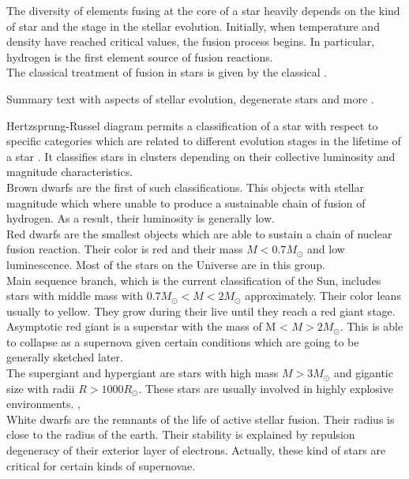 \documentclass[openany]{book}
\begin{document}
The diversity of elements fusing at the core of a star heavily depends on the kind of star and the stage in the stellar evolution.  Initially, when temperature and density have reached critical values, the fusion process begins. In particular, hydrogen is the first element source of fusion reactions. \\

The classical treatment of fusion in stars is given by the classical \cite{burbidge_burbidge_fowler_hoyle_1957}.

Summary text with aspects of stellar evolution, degenerate stars and more \cite{kundt_2005}.

Hertzsprung-Russel diagram permits a classification of a star with respect to specific categories which are related to different evolution stages in the lifetime of a star \cite{arsentieva_shevchenko_2021}. It classifies stars in clusters depending on their collective luminosity and magnitude characteristics. \\

Brown dwarfs are the first of such classifications. This objects with stellar magnitude which where unable to produce a sustainable chain of fusion of hydrogen. As a result, their luminosity is generally low. \\

Red dwarfs are the smallest objects which are able to sustain a chain of nuclear fusion reaction. Their color is red and their mass $M < 0.7M_{\odot}$ and low luminescence. Most of the stars on the Universe are in this group. \\

Main sequence branch, which is the current classification of the Sun, includes stars with middle mass with $ 0.7M_{\odot} < M < 2M_{\odot}$ approximately. Their color leans usually to yellow. They grow during their live until they reach a red giant stage. \\

Asymptotic red giant is a superstar with the mass of  M < $M > 2M_{\odot}$. This is able to collapse as a supernova given certain conditions which are going to be generally sketched later. \\

The supergiant and hypergiant are stars with  high mass $M > 3M_{\odot}$ and gigantic size with radii $R > 1000R_{\odot}$. These stars are usually involved in highly explosive environments. , \\

White dwarfs are the remnants of the life of active stellar fusion. Their radius is close to the radius of the earth. Their stability is explained by repulsion degeneracy of their exterior layer of electrons. Actually, these kind of stars are critical for certain kinds of supernovae. \\ 
\end{document}
